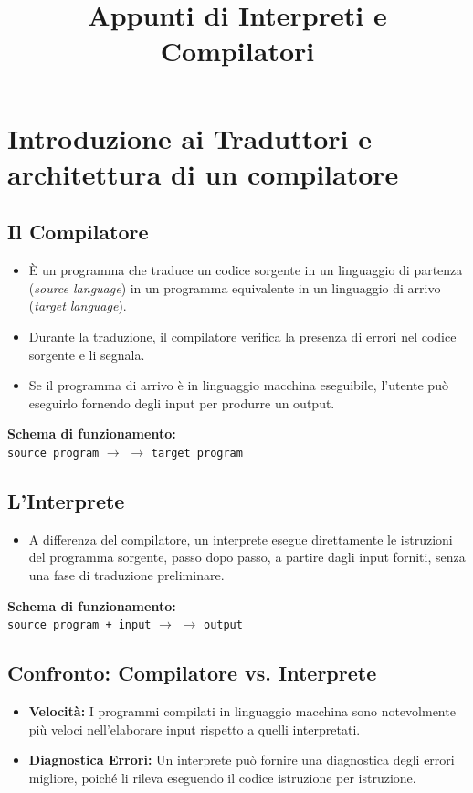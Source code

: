 \documentclass[a4paper, 11pt]{article}
\title{Appunti di Interpreti e Compilatori}
\author{}
\date{}
\begin{document}
\maketitle
\tableofcontents
\newpage

\section{Introduzione ai Traduttori e architettura di un compilatore}

\subsection{Il Compilatore}
\begin{itemize}
    \item È un programma che traduce un codice sorgente in un linguaggio di partenza (\textit{source language}) in un programma equivalente in un linguaggio di arrivo (\textit{target language}).
    \item Durante la traduzione, il compilatore verifica la presenza di errori nel codice sorgente e li segnala.
    \item Se il programma di arrivo è in linguaggio macchina eseguibile, l'utente può eseguirlo fornendo degli input per produrre un output.
\end{itemize}
\textbf{Schema di funzionamento:}\\
\texttt{source program} $\rightarrow$  $\rightarrow$ \texttt{target program}

\subsection{L'Interprete}
\begin{itemize}
    \item A differenza del compilatore, un interprete esegue direttamente le istruzioni del programma sorgente, passo dopo passo, a partire dagli input forniti, senza una fase di traduzione preliminare.
\end{itemize}
\textbf{Schema di funzionamento:}\\
\texttt{source program + input} $\rightarrow$  $\rightarrow$ \texttt{output}

\subsection{Confronto: Compilatore vs. Interprete}
\begin{itemize}
    \item \textbf{Velocità:} I programmi compilati in linguaggio macchina sono notevolmente più veloci nell'elaborare input rispetto a quelli interpretati.
    \item \textbf{Diagnostica Errori:} Un interprete può fornire una diagnostica degli errori migliore, poiché li rileva eseguendo il codice istruzione per istruzione.
\end{itemize}
\end{document}
